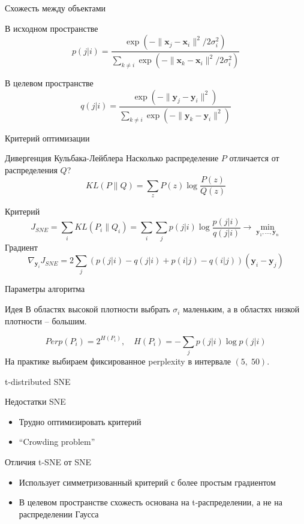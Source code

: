 \documentclass[10pt]{beamer}
\begin{document}
\begin{frame}{Схожесть между объектами}

В исходном пространстве
\[
p(j | i) = \frac{\exp(-\|\mathbf{x}_j-\mathbf{x}_i\|^2/{2 \sigma_i^2})}{\sum_{k \neq i}\exp(-\|\mathbf{x}_k-\mathbf{x}_i\|^2/{2 \sigma_i^2})}
\]

В целевом пространстве
\[
q(j | i) = \frac{\exp(-\|\mathbf{y}_j-\mathbf{y}_i\|^2)}{\sum_{k \neq i}\exp(-\|\mathbf{y}_k-\mathbf{y}_i\|^2)}
\]

\end{frame}

\begin{frame}{Критерий оптимизации}

\begin{block}{Дивергенция Кульбака-Лейблера}
Насколько распределение $P$ отличается от распределения $Q$?
\[
KL(P \| Q) = \sum_z P(z) \log \frac{P(z)}{Q(z)}
\]
\end{block}

Критерий
\[
J_{SNE} = \sum_i KL(P_i \| Q_i) = \sum_i \sum_j p(j | i) \log \frac{p(j | i)}{q(j | i)} \rightarrow \min_{\mathbf{y}_1, \ldots, \mathbf{y}_n}
\]
Градиент
\[
\nabla_{\mathbf{y}_i} J_{SNE} = 2 \sum_j \left(p(j | i) - q(j | i) + p(i | j) - q(i | j) \right) (\mathbf{y}_i-\mathbf{y}_j)
\]

\end{frame}

\begin{frame}{Параметры алгоритма}

\begin{exampleblock}{Идея}
В областях высокой плотности выбрать $\sigma_i$ маленьким, а в областях низкой плотности -- большим.
\end{exampleblock}
\[
Perp(P_i) = 2^{H(P_i)}, \quad H(P_i) = - \sum_j p(j | i) \log p(j | i)
\]
На практике выбираем фиксированное perplexity в интервале $(5, \; 50)$.

\end{frame}

\begin{frame}{t-distributed SNE}

Недостатки SNE
\begin{itemize}
\item Трудно оптимизировать критерий
\item ``Crowding problem''
\end{itemize}

\vspace{1em}
Отличия t-SNE от SNE
\begin{itemize}
\item Использует симметризованный критерий с более простым градиентом
\item В целевом пространстве схожесть основана на t-распределении, а не на распределении Гаусса
\end{itemize}

\end{frame}
\end{document}
